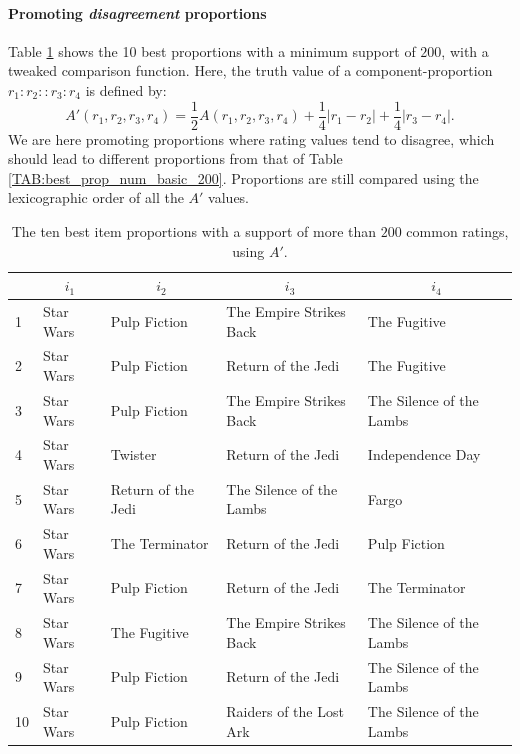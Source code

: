 \paragraph{Promoting \textit{disagreement} proportions\\}

Table \ref{TAB:best_prop_num_customTV_200} shows the 10 best proportions with a
minimum support of $200$, with a tweaked comparison function. Here, the truth
value of a component-proportion $r_1 : r_2 :: r_3 : r_4$ is defined by:
$$A'(r_1, r_2, r_3, r_4) = \frac{1}{2} A(r_1, r_2, r_3, r_4) + \frac{1}{4} |r_1
- r_2| + \frac{1}{4} |r_3 - r_4|.$$
We are here promoting proportions where rating values tend to disagree, which
should lead to different proportions from that of Table
\ref{TAB:best_prop_num_basic_200}. Proportions are still compared using the
lexicographic order of all the $A'$ values.
\begin{table}[h!]
\centering
  \begin{tabular}{ l l  l  l l }
\toprule
    & \multicolumn{1}{c}{$i_1$}  & \multicolumn{1}{c}{$i_2$} &
    \multicolumn{1}{c}{$i_3$} & \multicolumn{1}{c}{$i_4$}\\
  \midrule
    1& Star Wars  & Pulp Fiction  & The Empire Strikes Back  & The Fugitive   \\
    2& Star Wars  & Pulp Fiction  & Return of the Jedi  & The Fugitive   \\
    3&Star Wars  & Pulp Fiction  & The Empire Strikes Back  & The Silence of the Lambs   \\
    4&Star Wars  & Twister  & Return of the Jedi  & Independence Day  \\
    5&Star Wars  & Return of the Jedi  & The Silence of the Lambs  & Fargo   \\
    6&Star Wars  & The Terminator  & Return of the Jedi  & Pulp Fiction   \\
    7&Star Wars  & Pulp Fiction  & Return of the Jedi  & The Terminator   \\
    8&Star Wars  & The Fugitive  & The Empire Strikes Back  & The Silence of the Lambs   \\
    9& Star Wars  & Pulp Fiction  & Return of the Jedi  & The Silence of the Lambs   \\
   10&Star Wars  & Pulp Fiction  & Raiders of the Lost Ark  & The Silence of the Lambs   \\
\bottomrule
\end{tabular}
\caption{The ten best item proportions with a support of more than $200$ common
  ratings, using $A'$.}
\label{TAB:best_prop_num_customTV_200}
\end{table}

